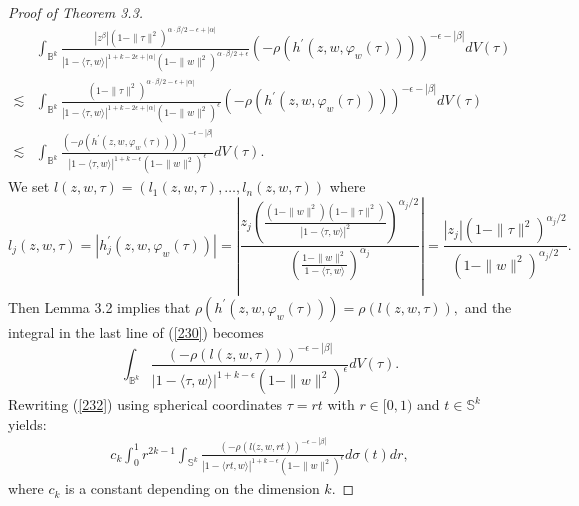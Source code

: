 \documentclass[reqno,12pt]{amsart}
\numberwithin{equation}{section}
\begin{document}
\begin{proof}[Proof of Theorem 3.3]
			\begin{align}\label{230}
			&\int_{\mathbb B^k}\frac{|z^{\beta}|(1-\|{\tau}\|^2)^{\alpha\cdot\beta/2-\epsilon+|\alpha|}}{|1-\langle {\tau},w\rangle|^{1+k-2\epsilon+|\alpha|}(1-\|w\|^2)^{\alpha\cdot\beta/2+\epsilon}}\left(-\rho\left(h^{\prime}(z,w,\varphi_w({\tau})) \right)\right)^{-\epsilon-|\beta|}dV({\tau})\nonumber
			\\\lesssim& \int_{\mathbb B^k}\frac{(1-\|{\tau}\|^2)^{\alpha\cdot\beta/2-\epsilon+|\alpha|}}{|1-\langle {\tau},w\rangle|^{1+k-2\epsilon+|\alpha|}(1-\|w\|^2)^{\epsilon}}\left(-\rho\left(h^{\prime}(z,w,\varphi_w({\tau})) \right)\right)^{-\epsilon-|\beta|}dV({\tau})\nonumber
			\\\lesssim& \int_{\mathbb B^k}\frac{\left(-\rho\left(h^{\prime}(z,w,\varphi_w({\tau})) \right)\right)^{-\epsilon-|\beta|}}{|1-\langle {\tau},w\rangle|^{1+k-\epsilon}(1-\|w\|^2)^{\epsilon}}dV({\tau}).
			\end{align}
		We set $l(z,w,{\tau})=(l_1(z,w,{\tau}),\dots,l_n(z,w,{\tau}))$ where 
			$$l_j(z,w,{\tau})=\left|h^{\prime}_j\left(z,w,\varphi_w({\tau})\right)\right|=\left|\frac{z_j\left(\frac{(1-\|w\|^2)(1-\|{\tau}\|^2)}{|1-\langle {\tau},w\rangle|^2}\right)^{\alpha_j/2}}{\left(\frac{1-\|w\|^2}{1-\langle {\tau},w\rangle}\right)^{\alpha_j}}\right|=\frac{|z_j|(1-\|{\tau}\|^2)^{\alpha_j/2}}{(1-\|w\|^2)^{\alpha_j/2}}.$$
			Then Lemma 3.2 implies that
			$\rho(h^{\prime}(z,w,\varphi_w({\tau})) )=\rho(l(z,w,{\tau}) ),$
			and the integral in the last line of (\ref{230}) becomes
			\begin{equation}\label{232}
			\int_{\mathbb B^k}\frac{\left(-\rho\left(l(z,w,{\tau}) \right)\right)^{-\epsilon-|\beta|}}{|1-\langle {\tau},w\rangle|^{1+k-\epsilon}(1-\|w\|^2)^{\epsilon}}dV({\tau}).
			\end{equation}
			Rewriting (\ref{232}) using spherical coordinates {$\tau=rt$ with $r\in [0,1)$ and $t\in \mathbb S^k$} yields:
			\begin{align}\label{240}
			c_k\int_{0}^{1}r^{2k-1}\int_{\mathbb S^k}\frac{\left(-\rho\left(l(z,w,r t\right)\right)^{-\epsilon-|\beta|}}{|1-\langle rt,w\rangle|^{1+k-\epsilon}(1-\|w\|^2)^{\epsilon}}d\sigma (t)dr,
			\end{align}
			where $c_k$ is a constant depending on the dimension $k$.
			

\end{proof}
\end{document}
